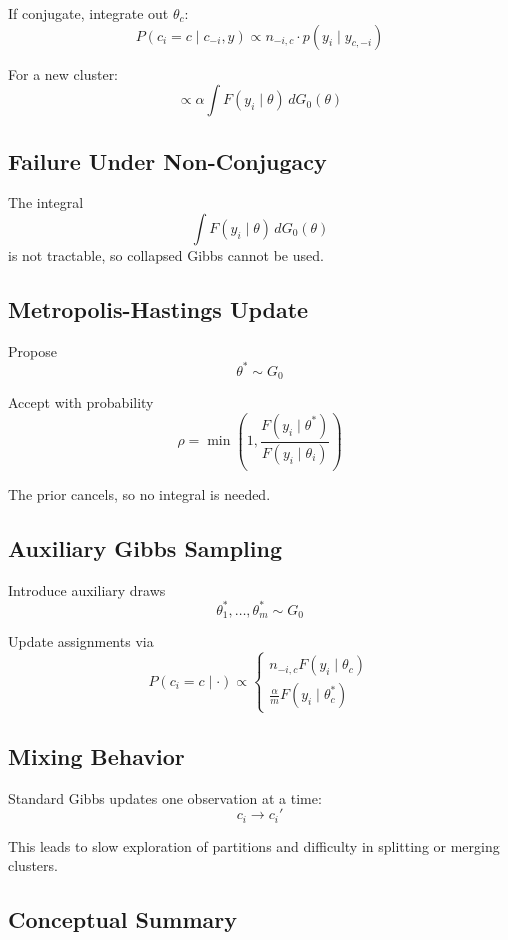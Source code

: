 \documentclass[12pt,oneside]{book}
\numberwithin{equation}{section}
\theoremstyle{definition}
\theoremstyle{plain}
\theoremstyle{remark}
\begin{document}
If conjugate, integrate out $\theta_c$:
\[
P(c_i = c \mid c_{-i}, y)
\propto
n_{-i,c} \cdot p(y_i \mid y_{c,-i})
\]

For a new cluster:
\[
\propto
\alpha \int F(y_i \mid \theta)\, dG_0(\theta)
\]

\subsection*{Failure Under Non-Conjugacy}

The integral
\[
\int F(y_i \mid \theta)\, dG_0(\theta)
\]
is not tractable, so collapsed Gibbs cannot be used.

\subsection*{Metropolis-Hastings Update}

Propose
\[
\theta^* \sim G_0
\]

Accept with probability
\[
\rho = \min\left(1, \frac{F(y_i \mid \theta^*)}{F(y_i \mid \theta_i)}\right)
\]

The prior cancels, so no integral is needed.

\subsection*{Auxiliary Gibbs Sampling}

Introduce auxiliary draws
\[
\theta_1^*, \dots, \theta_m^* \sim G_0
\]

Update assignments via
\[
P(c_i = c \mid \cdot)
\propto
\begin{cases}
n_{-i,c} F(y_i \mid \theta_c) \\
\frac{\alpha}{m} F(y_i \mid \theta_c^*)
\end{cases}
\]

\subsection*{Mixing Behavior}

Standard Gibbs updates one observation at a time:
\[
c_i \to c_i'
\]

This leads to slow exploration of partitions and difficulty in splitting or merging clusters.

\subsection*{Conceptual Summary}
\end{document}
